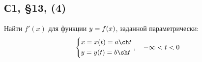 \documentclass[a4paper,12pt]{article}
\begin{document}
  \subsection{С1, \S 13, (4)}

  Найти $f'(x)$ для функции $y \hm= f(x)$, заданной параметрически:
  \begin{equation}\label{eq:1-13-204(1)-given}
    \left\{
      \begin{aligned}
        &x = x(t) = a \ch t\\
        &y = y(t) = b \sh t
      \end{aligned}
    \right.,\quad -\infty < t < 0
  \end{equation}

\end{document}

